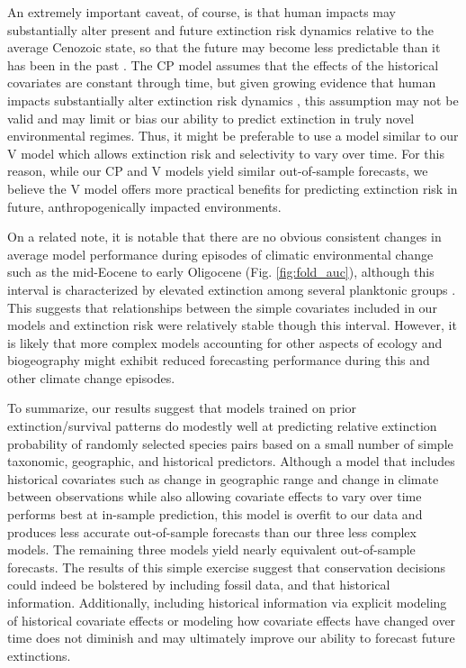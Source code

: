 \documentclass[12pt,letterpaper]{article}
\begin{document}
\begin{refsection}
An extremely important caveat, of course, is that human impacts may substantially alter present and future extinction risk dynamics relative to the average Cenozoic state, so that the future may become less predictable than it has been in the past \citep{Harnik2012a,Finnegan2015}. The CP model assumes that the effects of the historical covariates are constant through time, but given growing evidence that human impacts substantially alter extinction risk dynamics \citep{Harnik2012a,Finnegan2015,Payne2007}, this assumption may not be valid and may limit or bias our ability to predict extinction in truly novel environmental regimes. Thus, it might be preferable to use a model similar to our V model which allows extinction risk and selectivity to vary over time. For this reason, while our CP and V models yield similar out-of-sample forecasts, we believe the V model offers more practical benefits for predicting extinction risk in future, anthropogenically impacted environments.

On a related note, it is notable that there are no obvious consistent changes in average model performance during episodes of climatic environmental change such as the mid-Eocene to early Oligocene (Fig. \ref{fig:fold_auc}), although this interval is characterized by elevated extinction among several planktonic groups \citep{Prothero1994,Wade2008,Kamikuri2012}. This suggests that relationships between the simple covariates included in our models and extinction risk were relatively stable though this interval.  However, it is likely that more complex models accounting for other aspects of ecology and biogeography might exhibit reduced forecasting performance during this and other climate change episodes.

To summarize, our results suggest that models trained on prior extinction/survival patterns do modestly well at predicting relative extinction probability of randomly selected species pairs based on a small number of simple taxonomic, geographic, and historical predictors. Although a model that includes historical covariates such as change in geographic range and change in climate between observations while also allowing covariate effects to vary over time performs best at in-sample prediction, this model is overfit to our data and produces less accurate out-of-sample forecasts than our three less complex models. The remaining three models yield nearly equivalent out-of-sample forecasts. The results of this simple exercise suggest that conservation decisions could indeed be bolstered by including fossil data, and that historical information. Additionally, including historical information via explicit modeling of historical covariate effects or modeling how covariate effects have changed over time does not diminish and may ultimately improve our ability to forecast future extinctions. 



\end{refsection}
\end{document}

